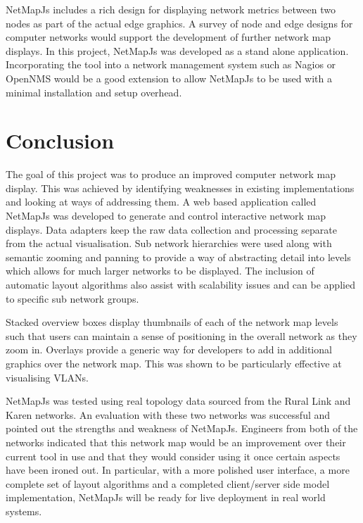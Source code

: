 \documentclass[11pt, a4paper]{article}
\begin{document}
NetMapJs includes a rich design for displaying network metrics between two nodes
as part of the actual edge graphics. A survey of node and edge designs for
computer networks would support the development of further network map displays.
In this project, NetMapJs was developed as a stand alone application.
Incorporating the tool into a network management system such as
Nagios \cite{Nagios_website} or OpenNMS \cite{OpenNMS_website} would be a good
extension to allow NetMapJs to be used with a minimal installation and setup
overhead.

\newpage

\section{Conclusion}
\label{sec:conclusion}



The goal of this project was to produce an improved computer network map
display. This was achieved by identifying weaknesses in existing implementations
and looking at ways of addressing them. A web based application called NetMapJs
was developed to generate and control interactive network map displays. Data
adapters keep the raw data collection and processing separate from the actual
visualisation. Sub network hierarchies were used along with semantic zooming and
panning to provide a way of abstracting detail into levels which allows for much
larger networks to be displayed. The inclusion of automatic layout algorithms
also assist with scalability issues and can be applied to specific sub network
groups. 

Stacked overview boxes display thumbnails of each of the network map
levels such that users can maintain a sense of positioning in the overall
network as they zoom in. Overlays provide a generic way for developers to add in
additional graphics over the network map. This was shown to be particularly
effective at visualising VLANs.

NetMapJs was tested using real topology data sourced from the Rural Link and
Karen networks. An evaluation with these two networks was successful and pointed
out the strengths and weakness of NetMapJs. Engineers from both of the networks
indicated that this network map would be an improvement over their current tool
in use and that they would consider using it once certain aspects have been
ironed out. In particular, with a more polished user interface, a more complete
set of layout algorithms and a completed client/server side model
implementation, NetMapJs will be ready for live deployment in real world
systems.
\end{document}
